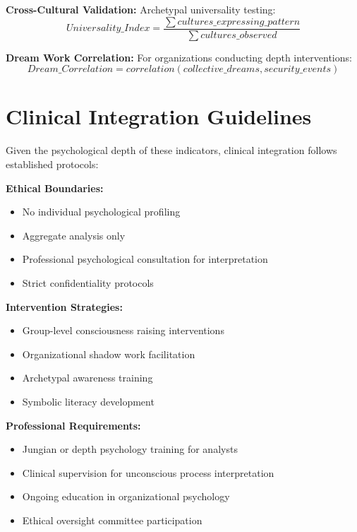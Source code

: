 \documentclass[11pt,a4paper]{article}
\begin{document}
\textbf{Cross-Cultural Validation:}
Archetypal universality testing:
\begin{equation}
Universality\_Index = \frac{\sum cultures\_expressing\_pattern}{\sum cultures\_observed}
\end{equation}

\textbf{Dream Work Correlation:}
For organizations conducting depth interventions:
\begin{equation}
Dream\_Correlation = correlation(collective\_dreams, security\_events)
\end{equation}

\section{Clinical Integration Guidelines}

Given the psychological depth of these indicators, clinical integration follows established protocols:

\textbf{Ethical Boundaries:}
\begin{itemize}
\item No individual psychological profiling
\item Aggregate analysis only
\item Professional psychological consultation for interpretation
\item Strict confidentiality protocols
\end{itemize}

\textbf{Intervention Strategies:}
\begin{itemize}
\item Group-level consciousness raising interventions
\item Organizational shadow work facilitation
\item Archetypal awareness training
\item Symbolic literacy development
\end{itemize}

\textbf{Professional Requirements:}
\begin{itemize}
\item Jungian or depth psychology training for analysts
\item Clinical supervision for unconscious process interpretation
\item Ongoing education in organizational psychology
\item Ethical oversight committee participation
\end{itemize}
\end{document}
